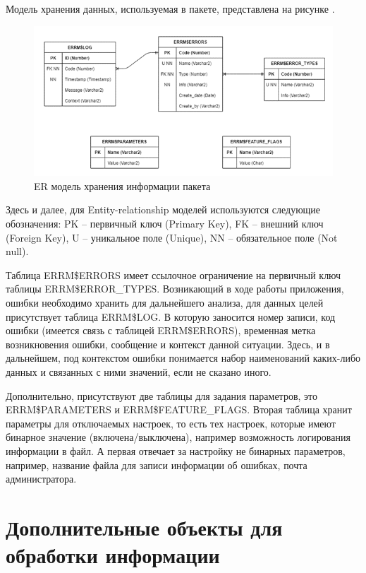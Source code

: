 Модель хранения данных, используемая в пакете, представлена на рисунке .

\begin{figure}[ht!] 
	\center
	\includegraphics [scale=1] {my_folder/img/C3_er_model.png}
	\caption{ER модель хранения информации пакета} 
	\label{fig:C3_er_model}  
\end{figure}
\FloatBarrier

Здесь и далее, для Entity-relationship моделей используются следующие обозначения: PK – первичный ключ (Primary Key), FK – внешний ключ (Foreign Key), U – уникальное поле (Unique), NN – обязательное поле (Not null). 

Таблица ERRM\$ERRORS имеет ссылочное ограничение на первичный ключ таблицы ERRM\$ERROR\_TYPES. 
Возникающий в ходе работы приложения, ошибки необходимо хранить для дальнейшего анализа, для данных целей присутствует таблица ERRM\$LOG. В которую заносится номер записи, код ошибки (имеется связь с таблицей ERRM\$ERRORS), временная метка возникновения ошибки, сообщение и контекст данной ситуации. 
Здесь, и в дальнейшем, под контекстом ошибки понимается набор наименований каких-либо данных и связанных с ними значений, если не сказано иного.  

Дополнительно, присутствуют две таблицы для задания параметров, это ERRM\$PARAMETERS и ERRM\$FEATURE\_FLAGS. Вторая таблица хранит параметры для отключаемых настроек, то есть тех настроек, которые имеют бинарное значение (включена/выключена), например возможность логирования информации в файл. А первая отвечает за настройку не бинарных параметров, например, название файла для записи информации об ошибках, почта администратора. 


\section{Дополнительные объекты для обработки информации} \label{ch3:sec4}
 
